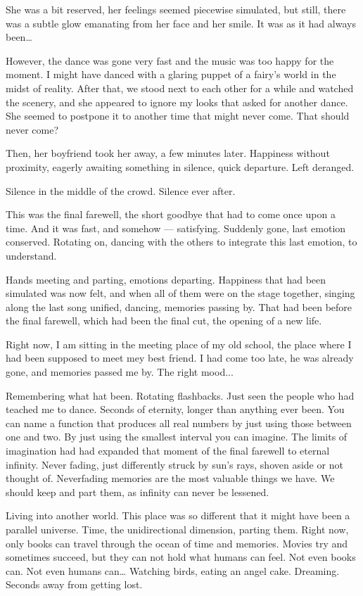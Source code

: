 She was a bit reserved, her feelings seemed piecewise simulated, but still, there was a subtle glow emanating from her face and her smile. It was as it had always been\ldots

However, the dance was gone very fast and the music was too happy for the moment. I might have danced with a glaring puppet of a fairy's world in the midst of reality. 
After that, we stood next to each other for a while and watched the scenery, and she appeared to ignore my looks that asked for another dance. She seemed to postpone it to another time that might never come. That should never come?

Then, her boyfriend took her away, a few minutes later. 
Happiness without proximity, eagerly awaiting something in silence, quick departure. Left deranged.

Silence in the middle of the crowd. 
Silence ever after. 

This was the final farewell, the short goodbye that had to come once upon a time. And it was fast, and somehow --- satisfying. Suddenly gone, last emotion conserved. 
Rotating on, dancing with the others to integrate this last emotion, to understand.

Hands meeting and parting, emotions departing. Happiness that had been simulated was now felt, and when all of them were on the stage together, singing along the last song unified, dancing, memories passing by. That had been before the final farewell, which had been the final cut, the opening of a new life.

Right now, I am sitting in the meeting place of my old school, the place where I had been supposed to meet mey best friend. I had come too late, he was already gone, and memories passed me by. The right mood...

Remembering what hat been. Rotating flashbacks. Just seen the people who had teached me to dance. 
Seconds of eternity, longer than anything ever been. You can name a function that produces all real numbers by just using those between one and two. By just using the smallest interval you can imagine. 
The limits of imagination had had expanded that moment of the final farewell to eternal infinity. Never fading, just differently struck by sun's rays, shoven aside or not thought of. 
Neverfading memories are the most valuable things we have. We should keep and part them, as infinity can never be lessened.

Living into another world. This place was so different that it might have been a parallel universe. Time, the unidirectional dimension, parting them. 
Right now, only books can travel through the ocean of time and memories. Movies try and sometimes succeed, but they can not hold what humans can feel. Not even books can. Not even humans can\ldots
Watching birds, eating an angel cake. Dreaming. Seconds away from getting lost.

